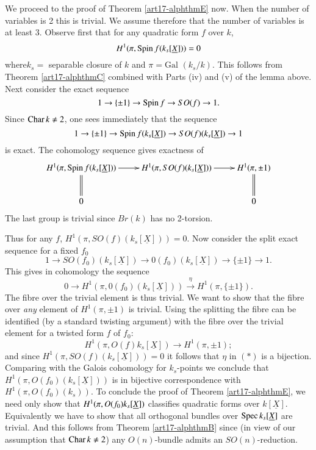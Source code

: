 We proceed to the proof of Theorem \ref{art17-alphthmE} now. When the number of variables is 2 this is trivial. We assume therefore that the number of variables is at least 3. Observe first that for any quadratic form $f$ over $k$,
$$
H^1 (\pi, \operatorname{Spin} f(k_s [\underline{X}])) = 0
$$
where\pageoriginale $k_s = $ separable closure of $k$ and $\pi = \text{Gal } (k_s /k)$. This follows from Theorem \ref{art17-alphthmC} combined with Parts (iv) and (v) of the lemma above. Next consider the exact sequence
$$
1 \to \{\pm 1\} \to \operatorname{Spin} f \to SO(f) \to 1.
$$
Since $\operatorname{Char} k \neq 2$, one sees immediately that the sequence
$$
1 \to \{\pm 1\} \to \operatorname{Spin} f(k_s [\underline{X}]) \to SO(f) (k_s [\underline{X}]) \to 1
$$
is exact. The cohomology sequence gives exactness of 
\[
\xymatrix{
H^1(\pi, \Spin f(k_s[\underline{X}])) \ar[r] \ar@{=}[d] & H^1 (\pi, SO(f) (k_s [\underline{X}])) \ar[r] & H^1 (\pi, \pm 1) \ar@{=}[d]\\
0 & & 0
}
\]
The last group is trivial since $Br(k)$ has no 2-torsion.

Thus for any $f$, $H^1 (\pi, SO(f) (k_s [\underline{X}])) =0$. Now consider the split exact sequence for a fixed $f_0$
$$
1 \to SO(f_0) (k_s [\underline{X}]) \to 0 (f_0) (k_s [\underline{X}]) \to \{\pm 1\} \to 1.
$$
This gives in cohomology the sequence
\begin{equation*}
0 \to H^1 (\pi, 0 (f_0) (k_s [\underline{X}])) \xrightarrow{\eta} H^1 (\pi, \{\pm 1\}). 
\tag{*}
\end{equation*}
The fibre over the trivial element is thus trivial. We want to show that the fibre over {\em any} element of $H^1 (\pi, \pm 1)$ is trivial. Using the splitting the fibre can be identified (by a standard twisting argument) with the fibre over the trivial element for a twisted form $f$ of $f_0$:
$$
H^1 (\pi, O(f) k_s [\underline{X}]) \to H^1 (\pi, \pm 1);
$$
and since $H^1 (\pi, SO(f)(k_s [\underline{X}]))=0$ it follows that $\eta$ in $(*)$ is a bijection. Comparing with the Galois cohomology for $k_s$-points we conclude that $H^1 (\pi, O(f_0) (k_s [\underline{X}]))$ is in bijective correspondence with $H^1 (\pi, O(f_0) (k_s))$. To conclude the proof of Theorem \ref{art17-alphthmE}, we need only show that $H^1 (\pi, O(f_0)\\ k_s [\underline{X}])$ classifies quadratic forms over $k[\underline{X}]$. Equivalently we have to show that all orthogonal bundles over $\operatorname{Spec} k_s [\underline{X}]$ are trivial. And this follows from Theorem \ref{art17-alphthmB} since (in view of our assumption that $\operatorname{Char} k \neq 2$) any $O(n)$-bundle admits an $SO(n)$-reduction.

